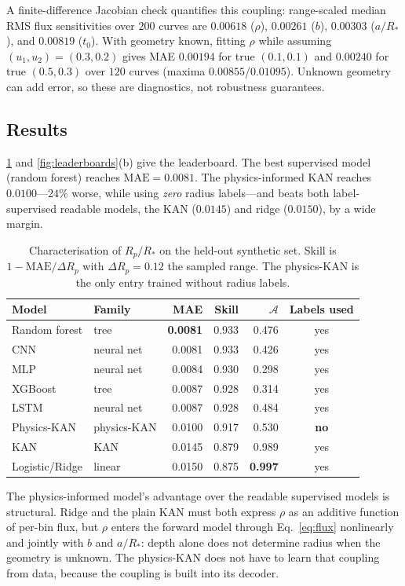\documentclass[manuscript,nonacm]{acmart}
\begin{document}
A finite-difference Jacobian check quantifies this coupling: range-scaled median RMS
flux sensitivities over $200$ curves are $0.00618$ ($\rho$), $0.00261$ ($b$), $0.00303$
($a/R_*$), and $0.00819$ ($t_0$). With geometry known, fitting $\rho$ while assuming
$(u_1,u_2)=(0.3,0.2)$ gives MAE $0.00194$ for true $(0.1,0.1)$ and $0.00240$ for true
$(0.5,0.3)$ over $120$ curves (maxima $0.00855$/$0.01095$). Unknown geometry can add
error, so these are diagnostics, not robustness guarantees.

\subsection{Results}
\cref{tab:regression} and \cref{fig:leaderboards}(b) give the leaderboard. The best
supervised model (random forest) reaches $\mathrm{MAE}=0.0081$. The physics-informed KAN
reaches $0.0100$---$24\%$ worse, while using \emph{zero} radius labels---and beats both
label-supervised readable models, the KAN ($0.0145$) and ridge ($0.0150$), by a wide
margin.

\begin{table}[t]
\centering
\caption{Characterisation of $R_p/R_*$ on the held-out synthetic set. Skill is
$1-\mathrm{MAE}/\Delta R_p$ with $\Delta R_p=0.12$ the sampled range. The physics-KAN is
the only entry trained without radius labels.}
\label{tab:regression}
\begin{tabular}{llrrrc}
\toprule
Model & Family & MAE & Skill & $\mathcal{A}$ & Labels used\\
\midrule
Random forest  & tree        & \textbf{0.0081} & 0.933 & 0.476 & yes\\
CNN            & neural net  & 0.0081 & 0.933 & 0.426 & yes\\
MLP            & neural net  & 0.0084 & 0.930 & 0.298 & yes\\
XGBoost        & tree        & 0.0087 & 0.928 & 0.314 & yes\\
LSTM           & neural net  & 0.0087 & 0.928 & 0.484 & yes\\
Physics-KAN    & physics-KAN & 0.0100 & 0.917 & 0.530 & \textbf{no}\\
KAN            & KAN         & 0.0145 & 0.879 & 0.989 & yes\\
Logistic/Ridge & linear      & 0.0150 & 0.875 & \textbf{0.997} & yes\\
\bottomrule
\end{tabular}
\end{table}

The physics-informed model's advantage over the readable supervised models is
structural. Ridge and the plain KAN must both express $\rho$ as an additive function of
per-bin flux, but $\rho$ enters the forward model through Eq.~\eqref{eq:flux}
nonlinearly and jointly with $b$ and $a/R_*$: depth alone does not determine radius when
the geometry is unknown. The physics-KAN does not have to learn that coupling from data,
because the coupling is built into its decoder.
\end{document}
